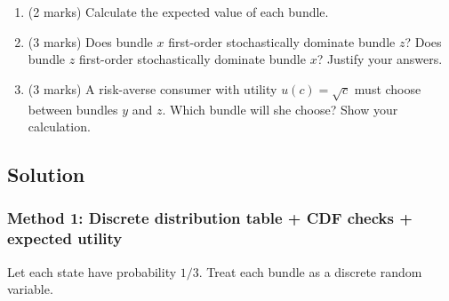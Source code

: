 \documentclass[12pt]{article}
\begin{document}
\begin{enumerate}[label=(\alph*)]
\item (2 marks) Calculate the expected value of each bundle.
\item (3 marks) Does bundle $x$ first-order stochastically dominate bundle $z$? Does bundle $z$ first-order stochastically dominate bundle $x$? Justify your answers.
\item (3 marks) A risk-averse consumer with utility $u(c) = \sqrt{c}$ must choose between bundles $y$ and $z$. Which bundle will she choose? Show your calculation.
\end{enumerate}

\bigskip

\subsection*{Solution}

\subsubsection*{Method 1: Discrete distribution table + CDF checks + expected utility}

Let each state have probability \(1/3\). Treat each bundle as a discrete random variable.
\end{document}

